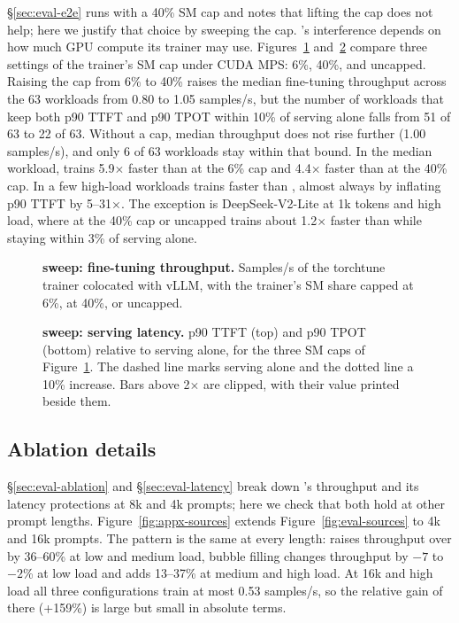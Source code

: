 \S\ref{sec:eval-e2e} runs \uncoord with a 40\% \ac{SM} cap and notes that
lifting the cap does not help; here we justify that choice by sweeping
the cap. \Uncoord's interference depends on how much GPU compute its
trainer may use. Figures~\ref{fig:appx-naive-tput}
and~\ref{fig:appx-naive-lat} compare three settings of the trainer's
\ac{SM} cap under CUDA MPS: 6\%, 40\%, and uncapped. Raising the cap
from 6\% to 40\% raises the median fine-tuning throughput across the 63
workloads from 0.80 to 1.05 samples/s, but the number of workloads that
keep both p90 \ac{TTFT} and p90 \ac{TPOT} within 10\% of serving alone
falls from 51 of 63 to 22 of 63. Without a cap, median throughput does
not rise further (1.00 samples/s), and only 6 of 63 workloads stay
within that bound. In the median workload, \sys{} trains 5.9$\times$
faster than \uncoord at the 6\% cap and 4.4$\times$ faster than
at the 40\% cap. In a few high-load workloads \uncoord trains
faster than \sys{}, almost always by inflating p90 \ac{TTFT} by
5--31$\times$. The exception is DeepSeek-V2-Lite at 1k tokens and high
load, where \uncoord at the 40\% cap or uncapped trains about
1.2$\times$ faster than \sys{} while staying within 3\% of serving alone.

\begin{figure}[t]
  \centering
  \caption{\textbf{\Uncoord sweep: fine-tuning throughput.}
    Samples/s of the torchtune trainer colocated with vLLM, with the
    trainer's \ac{SM} share capped at 6\%, at 40\%, or uncapped.}
  \label{fig:appx-naive-tput}
\end{figure}

\begin{figure}[t]
  \centering
  \caption{\textbf{\Uncoord sweep: serving latency.}
    p90 \ac{TTFT} (top) and p90 \ac{TPOT} (bottom) relative to serving
    alone, for the three \ac{SM} caps of
    Figure~\ref{fig:appx-naive-tput}. The dashed line marks serving alone
    and the dotted line a 10\% increase. Bars above 2$\times$ are clipped,
    with their value printed beside them.}
  \label{fig:appx-naive-lat}
\end{figure}
\subsection{Ablation details}
\label{sec:appx-ablation}

\S\ref{sec:eval-ablation} and \S\ref{sec:eval-latency} break down \sys{}'s
throughput and its latency protections at 8k and 4k prompts; here we
check that both hold at other prompt lengths.
Figure~\ref{fig:appx-sources} extends Figure~\ref{fig:eval-sources} to
4k and 16k prompts. The pattern is the same at every length:
\cfgOptColo raises throughput over \cfgColo by 36--60\% at low and
medium load, bubble filling changes throughput by $-7$ to $-2$\% at
low load and adds 13--37\% at medium and high load. At 16k and high load
all three configurations train at most 0.53 samples/s, so the
relative gain of \cfgOptColo there (+159\%) is large but small in
absolute terms.


